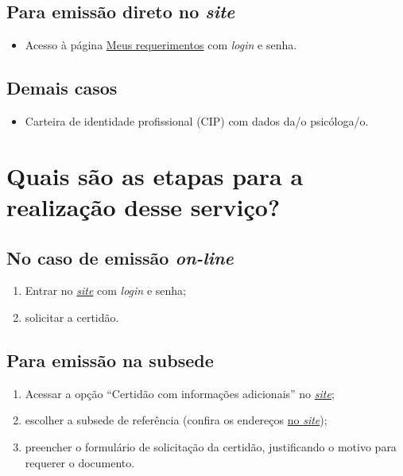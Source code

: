 \subsection{Para emissão direto no \emph{site}}

\begin{itemize}
  \item  Acesso à página  \href{https://cfpsp.brctotal.com/crp06_servicosonline/pgsRequerimento/Requerimentos.aspx}{Meus  requerimentos} com \emph{login} e senha.
\end{itemize}

\subsection{Demais casos}

\begin{itemize}
  \item  Carteira de identidade profissional (CIP) com dados da/o psicóloga/o.
\end{itemize}
\clearpage

\section{Quais são as etapas para a realização desse serviço?}
\vfill

\subsection{No caso de emissão \emph{on-line}}

\begin{enumerate}
  \item  Entrar no  \href{https://cfpsp.brctotal.com/crp06_servicosonline/pgsRequerimento/Requerimentos.aspx}{\emph{site}}  com \emph{login} e senha;
  \item  solicitar a certidão.
\end{enumerate}

\subsection{Para emissão na subsede}

\begin{enumerate}
  \item  Acessar a opção ``Certidão com informações adicionais'' no  \href{https://www.crpsp.org/pagina/view/326}{\emph{site}};
  \item  escolher a subsede de referência (confira os endereços  \href{https://www.crpsp.org/sede/index}{no \emph{site}});
  \item  preencher o formulário de solicitação da certidão, justificando o  motivo para requerer o documento.
\end{enumerate}
\vfill

